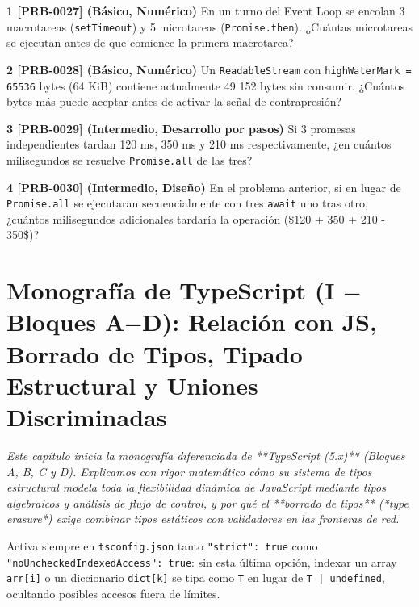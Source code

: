 \documentclass{book}
\begin{document}
\begin{tcolorbox}[title={Ejercicios}, studiumworked, breakable]

\noindent\textbf{1 [PRB-0027] (Básico, Numérico)}
En un turno del Event Loop se encolan 3 macrotareas (\texttt{setTimeout}) y 5 microtareas (\texttt{Promise.then}). ¿Cuántas microtareas se ejecutan antes de que comience la primera macrotarea?

\noindent\textbf{2 [PRB-0028] (Básico, Numérico)}
Un \texttt{ReadableStream} con \texttt{highWaterMark = 65536} bytes (64 KiB) contiene actualmente 49 152 bytes sin consumir. ¿Cuántos bytes más puede aceptar antes de activar la señal de contrapresión?

\noindent\textbf{3 [PRB-0029] (Intermedio, Desarrollo por pasos)}
Si 3 promesas independientes tardan 120 ms, 350 ms y 210 ms respectivamente, ¿en cuántos milisegundos se resuelve \texttt{Promise.all} de las tres?

\noindent\textbf{4 [PRB-0030] (Intermedio, Diseño)}
En el problema anterior, si en lugar de \texttt{Promise.all} se ejecutaran secuencialmente con tres \texttt{await} uno tras otro, ¿cuántos milisegundos adicionales tardaría la operación (\$120 + 350 + 210 - 350\$)?
\end{tcolorbox}

\chapter{Monografía de TypeScript (I \(-\) Bloques A\(-\)D): Relación con JS, Borrado de Tipos, Tipado Estructural y Uniones Discriminadas}
\label{chap:cap06-typescript-fundamentos-sistema-tipos-estructural-uniones}

\noindent\textit{Este capítulo inicia la monografía diferenciada de **TypeScript (5.x)** (Bloques A, B, C y D). Explicamos con rigor matemático cómo su sistema de tipos estructural modela toda la flexibilidad dinámica de JavaScript mediante tipos algebraicos y análisis de flujo de control, y por qué el **borrado de tipos** (*type erasure*) exige combinar tipos estáticos con validadores en las fronteras de red.}

\begin{tcolorbox}[title={Consejo}, studiumtip, breakable]

Activa siempre en \texttt{tsconfig.json} tanto \texttt{"strict": true} como \texttt{"noUncheckedIndexedAccess": true}: sin esta última opción, indexar un array \texttt{arr[i]} o un diccionario \texttt{dict[k]} se tipa como \texttt{T} en lugar de \texttt{T | undefined}, ocultando posibles accesos fuera de límites.
\end{tcolorbox}
\end{document}
